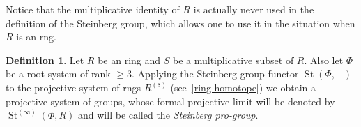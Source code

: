\documentclass{article}
\numberwithin{equation}{section}
\theoremstyle{definition}
\newtheorem{df}[lemma]{Definition} \Crefname{df}{Definition}{Definitions}
\theoremstyle{remark}
\DeclareMathOperator\St{St}
\DeclareMathOperator{\Pro}{Pro}
\newcommand{\Set}{\mathbf{Set}}
\newcommand{\Group}{\mathbf{Grp}}
\begin{document}
Notice that the multiplicative identity of $R$ is actually never used in the definition of the Steinberg group, 
 which allows one to use it in the situation when $R$ is an rng.
\begin{df}\label{def:Steinberg-homotope}
 Let $R$ be an ring and $S$ be a multiplicative subset of $R$. Also let $\Phi$ be a root system of rank $\geq 3$. Applying the Steinberg group functor $\St(\Phi, -)$ to the projective system of rngs $R^{(s)}$ (see~\cref{ring-homotope}) we obtain a projective system of groups, whose formal projective limit will be denoted by $\St^{(\infty)}(\Phi, R)$ and will be called the {\it Steinberg pro-group}.
 
\begin{comment}
 is the group given by generators $x_\alpha^{(s)}(a)$, $a\in R$, $\alpha\in\Phi$ and the following list of relations: \begin{align}
 x^{(s)}_\alpha(a) \cdot x^{(s)}_\alpha(b)    &= x^{(s)}_\alpha(a+b); \tag{S$1_s$} \label{S1} \\
 [x^{(s)}_\alpha(a),\ x^{(s)}_\beta(b)] &= 1, \tag{S$2_s$} \label{S2} \\ 
 \multispan2{\hfil if $\alpha + \beta \not\in\Phi \cup \{0\};$} \nonumber \\
 [x^{(s)}_\alpha(a),\ x^{(s)}_\beta(b)] &= x^{(s)}_{\alpha + \beta}(N_{\alpha,\beta} \cdot sab), \tag{S$3_s$} \label{S3} \\
 \multispan2{\hfill if $\alpha+\beta\in\Phi$ but $\alpha+2\beta,\ 2\alpha+\beta\not\in\Phi;$} \nonumber \\
 [x^{(s)}_\alpha(a),\ x^{(s)}_\beta(b)] &= x^{(s)}_{\alpha + \beta}(N_{\alpha,\beta} \cdot sab) \cdot x^{(s)}_{2\alpha+\beta}(N_{\alpha,\beta}^{2,1}\cdot s^2a^2b), \tag{S$4_s$} \label{S4} \\ \multispan2{ \hfill if $\alpha+\beta,2\alpha+\beta\in\Phi$.} \nonumber  \end{align} 
 Now if $R$ is a ring with a multiplicative system $S$, then for every $s, s' \in S$ there is a group homomorphism $\St^{(ss')}(\Phi, R) \to \St^{(s)}(\Phi, R)$ given by the obvious map $x_\alpha^{(ss')}(a) \mapsto x_\alpha^{(s')}(sa)$.
 These homomorphisms together form a projective system in $\Group$, whose formal projective limit will be called the {\it Steinberg pro-group} and will be denoted by $\St^{(\infty)}(\Phi, R)$.
 By definition, $\St^{(\infty)}(\Phi, R)$ is an object of $\Pro(\Group)$. It can also be considered as a group object in $\Pro(\Set)$. 
\end{comment}
\end{df}
\end{document}
